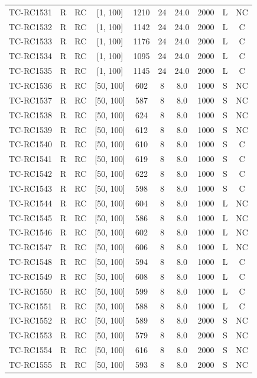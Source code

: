 \begin{longtable}{lccccccccc}
TC-RC1531 & R & RC & [1, 100] & 1210 & 24 & 24.0 & 2000 & L & NC \\
TC-RC1532 & R & RC & [1, 100] & 1142 & 24 & 24.0 & 2000 & L & C \\
TC-RC1533 & R & RC & [1, 100] & 1176 & 24 & 24.0 & 2000 & L & C \\
TC-RC1534 & R & RC & [1, 100] & 1095 & 24 & 24.0 & 2000 & L & C \\
TC-RC1535 & R & RC & [1, 100] & 1145 & 24 & 24.0 & 2000 & L & C \\
TC-RC1536 & R & RC & [50, 100] & 602 & 8 & 8.0 & 1000 & S & NC \\
TC-RC1537 & R & RC & [50, 100] & 587 & 8 & 8.0 & 1000 & S & NC \\
TC-RC1538 & R & RC & [50, 100] & 624 & 8 & 8.0 & 1000 & S & NC \\
TC-RC1539 & R & RC & [50, 100] & 612 & 8 & 8.0 & 1000 & S & NC \\
TC-RC1540 & R & RC & [50, 100] & 610 & 8 & 8.0 & 1000 & S & C \\
TC-RC1541 & R & RC & [50, 100] & 619 & 8 & 8.0 & 1000 & S & C \\
TC-RC1542 & R & RC & [50, 100] & 622 & 8 & 8.0 & 1000 & S & C \\
TC-RC1543 & R & RC & [50, 100] & 598 & 8 & 8.0 & 1000 & S & C \\
TC-RC1544 & R & RC & [50, 100] & 604 & 8 & 8.0 & 1000 & L & NC \\
TC-RC1545 & R & RC & [50, 100] & 586 & 8 & 8.0 & 1000 & L & NC \\
TC-RC1546 & R & RC & [50, 100] & 602 & 8 & 8.0 & 1000 & L & NC \\
TC-RC1547 & R & RC & [50, 100] & 606 & 8 & 8.0 & 1000 & L & NC \\
TC-RC1548 & R & RC & [50, 100] & 594 & 8 & 8.0 & 1000 & L & C \\
TC-RC1549 & R & RC & [50, 100] & 608 & 8 & 8.0 & 1000 & L & C \\
TC-RC1550 & R & RC & [50, 100] & 599 & 8 & 8.0 & 1000 & L & C \\
TC-RC1551 & R & RC & [50, 100] & 588 & 8 & 8.0 & 1000 & L & C \\
TC-RC1552 & R & RC & [50, 100] & 589 & 8 & 8.0 & 2000 & S & NC \\
TC-RC1553 & R & RC & [50, 100] & 579 & 8 & 8.0 & 2000 & S & NC \\
TC-RC1554 & R & RC & [50, 100] & 616 & 8 & 8.0 & 2000 & S & NC \\
TC-RC1555 & R & RC & [50, 100] & 593 & 8 & 8.0 & 2000 & S & NC \\

\end{longtable}
